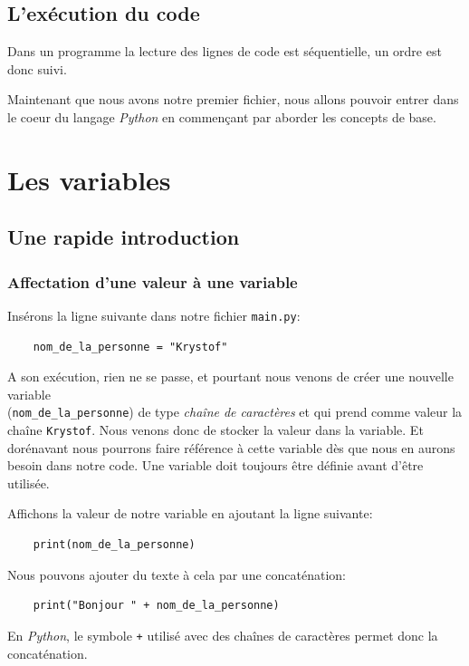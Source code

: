 \documentclass[a4paper,12pt]{book}
\begin{document}
\section{L'exécution du code}
Dans un programme la lecture des lignes de code est séquentielle, un ordre est donc suivi. 
\medskip

Maintenant que nous avons notre premier fichier, nous allons pouvoir entrer dans le coeur du langage \textit{Python} en commençant par aborder les concepts de base.
\medskip

\chapter{Les variables}
\section{Une rapide introduction}
\subsection*{Affectation d'une valeur à une variable}
Insérons la ligne suivante dans notre fichier \texttt{main.py}:
\begin{verbatim}
    nom_de_la_personne = "Krystof"
\end{verbatim}
\medskip

A son exécution, rien ne se passe, et pourtant nous venons de créer une nouvelle variable \\(\texttt{nom\_de\_la\_personne}) de type \textit{chaîne de caractères} et qui prend comme valeur la chaîne \texttt{Krystof}. Nous venons donc de stocker la valeur dans la variable. Et dorénavant nous pourrons faire référence à cette variable dès que nous en aurons besoin dans notre code. Une variable doit toujours être définie avant d'être utilisée.
\medskip

Affichons la valeur de notre variable en ajoutant la ligne suivante:
\begin{verbatim}
    print(nom_de_la_personne)
\end{verbatim}
\medskip

Nous pouvons ajouter du texte à cela par une concaténation:
\begin{verbatim}
    print("Bonjour " + nom_de_la_personne)
\end{verbatim}
En \textit{Python}, le symbole \texttt{+} utilisé avec des chaînes de caractères permet donc la concaténation.
\medskip
\end{document}
